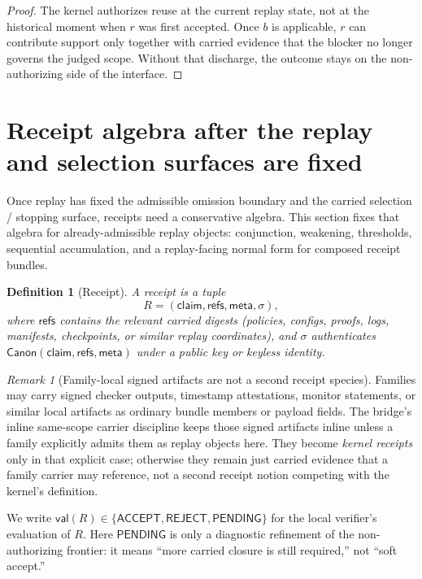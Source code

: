 \documentclass[11pt]{article}
\newtheorem{definition}{Definition}
\theoremstyle{remark}
\newtheorem{remark}{Remark}
\newcommand{\Acc}{\mathsf{ACCEPT}}
\newcommand{\Rej}{\mathsf{REJECT}}
\newcommand{\Pend}{\mathsf{PENDING}}
\newcommand{\Canon}{\mathsf{Canon}}
\begin{document}
\begin{proof}
The kernel authorizes reuse at the current replay state, not at the historical moment when $r$ was first accepted.
Once $b$ is applicable, $r$ can contribute support only together with carried evidence that the blocker no longer governs the judged scope.
Without that discharge, the outcome stays on the non-authorizing side of the interface.
\end{proof}


\section{Receipt algebra after the replay and selection surfaces are fixed}
Once replay has fixed the admissible omission boundary and the carried selection / stopping surface, receipts need a conservative algebra.
This section fixes that algebra for already-admissible replay objects: conjunction, weakening, thresholds, sequential accumulation, and a replay-facing normal form for composed receipt bundles.

\begin{definition}[Receipt]
A receipt is a tuple
\[
R=(\mathsf{claim},\mathsf{refs},\mathsf{meta},\sigma),
\]
where $\mathsf{refs}$ contains the relevant carried digests (policies, configs, proofs, logs, manifests, checkpoints, or similar replay coordinates), and $\sigma$ authenticates
$\Canon(\mathsf{claim},\mathsf{refs},\mathsf{meta})$ under a public key or keyless identity.
\end{definition}

\begin{remark}[Family-local signed artifacts are not a second receipt species]
Families may carry signed checker outputs, timestamp attestations, monitor statements, or similar local artifacts as ordinary bundle members or payload fields.
The bridge's inline same-scope carrier discipline keeps those signed artifacts inline unless a family explicitly admits them as replay objects here.
They become \emph{kernel receipts} only in that explicit case; otherwise they remain just carried evidence that a family carrier may reference, not a second receipt notion competing with the kernel's definition.
\end{remark}

We write $\mathsf{val}(R)\in\{\Acc,\Rej,\Pend\}$ for the local verifier's evaluation of $R$.
Here $\Pend$ is only a diagnostic refinement of the non-authorizing frontier: it means ``more carried closure is still required,'' not ``soft accept.''
\end{document}
